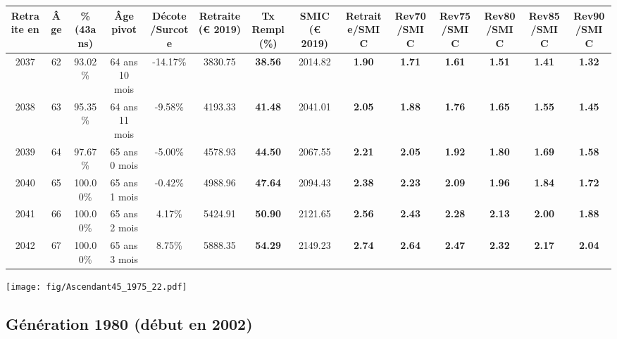 \begin{adjustbox}{max width=\textwidth} 
\begin{tabular}[htb]{|c|c||c|c|c||c|c||c||c|c|c|c|c|c|} 
\hline 
 Retraite en &  Âge &  \%(43ans) &  Âge pivot &  Décote/Surcote &  Retraite (\euro{} 2019) &  Tx Rempl(\%) &  SMIC (\euro{} 2019) &  Retraite/SMIC &  Rev70/SMIC &  Rev75/SMIC &  Rev80/SMIC &  Rev85/SMIC &  Rev90/SMIC \\ 
\hline \hline 
 2037 &  62 &  93.02\% &  64 ans 10 mois &  -14.17\% &  3830.75 &  {\bf 38.56} &  2014.82 &  {\bf 1.90} &  {\bf 1.71} &  {\bf 1.61} &  {\bf 1.51} &  {\bf 1.41} &  {\bf 1.32} \\ 
\hline 
 2038 &  63 &  95.35\% &  64 ans 11 mois &  -9.58\% &  4193.33 &  {\bf 41.48} &  2041.01 &  {\bf 2.05} &  {\bf 1.88} &  {\bf 1.76} &  {\bf 1.65} &  {\bf 1.55} &  {\bf 1.45} \\ 
\hline 
 2039 &  64 &  97.67\% &  65 ans 0 mois &  -5.00\% &  4578.93 &  {\bf 44.50} &  2067.55 &  {\bf 2.21} &  {\bf 2.05} &  {\bf 1.92} &  {\bf 1.80} &  {\bf 1.69} &  {\bf 1.58} \\ 
\hline 
 2040 &  65 &  100.00\% &  65 ans 1 mois &  -0.42\% &  4988.96 &  {\bf 47.64} &  2094.43 &  {\bf 2.38} &  {\bf 2.23} &  {\bf 2.09} &  {\bf 1.96} &  {\bf 1.84} &  {\bf 1.72} \\ 
\hline 
 2041 &  66 &  100.00\% &  65 ans 2 mois &  4.17\% &  5424.91 &  {\bf 50.90} &  2121.65 &  {\bf 2.56} &  {\bf 2.43} &  {\bf 2.28} &  {\bf 2.13} &  {\bf 2.00} &  {\bf 1.88} \\ 
\hline 
 2042 &  67 &  100.00\% &  65 ans 3 mois &  8.75\% &  5888.35 &  {\bf 54.29} &  2149.23 &  {\bf 2.74} &  {\bf 2.64} &  {\bf 2.47} &  {\bf 2.32} &  {\bf 2.17} &  {\bf 2.04} \\ 
\hline 
\hline 
\end{tabular} 
\end{adjustbox} 
 
 \vspace{0.1cm} 

 \begin{center}\texttt{[image: fig/Ascendant45\_1975\_22.pdf]}\end{center} \label{fig/Ascendant45_1975_22.pdf} 

\newpage 
 
\subsection{Génération 1980 (début en 2002)} 

